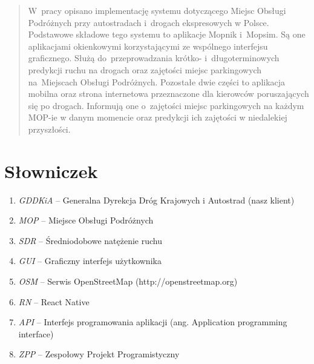 
\usepackage{graphicx}
\usepackage[breaklinks=true]{hyperref}
\usepackage{dirtree}
\usepackage{graphicx,wrapfig,lipsum}
\usepackage{caption}


\maketitle

\begin{abstract}
  W~pracy opisano implementację systemu dotyczącego Miejsc Obsługi Podróżnych
  przy autostradach i~drogach ekspresowych w Polsce. Podstawowe składowe tego
  systemu to aplikacje Mopnik i~Mopsim. Są one aplikacjami okienkowymi
  korzystającymi ze wspólnego interfejsu graficznego. Służą do~przeprowadzania
  krótko- i~długoterminowych predykcji ruchu na drogach oraz zajętości miejsc
  parkingowych na~Miejscach Obsługi Podróżnych. Pozostałe dwie części to
  aplikacja mobilna oraz strona internetowa przeznaczone dla kierowców
  poruszających się po drogach. Informują one o~zajętości miejsc parkingowych
  na każdym MOP-ie w danym momencie oraz predykcji ich zajętości w niedalekiej
  przyszłości.  
\end{abstract}

\tableofcontents

\chapter*{Słowniczek}\label{r:pojecia}

\begin{enumerate}
  \item\emph{GDDKiA} -- Generalna Dyrekcja Dróg Krajowych i Autostrad (nasz klient)
  \item\emph{MOP} -- Miejsce Obsługi Podróżnych
  \item\emph{SDR} -- Średniodobowe natężenie ruchu
  \item\emph{GUI} -- Graficzny interfejs użytkownika
  \item\emph{OSM} -- Serwis OpenStreetMap (http://openstreetmap.org)
  \item\emph{RN} -- React Native
  \item\emph{API} -- Interfejs programowania aplikacji (ang. Application programming interface)
  \item\emph{ZPP} -- Zespołowy Projekt Programistyczny
\end{enumerate}

